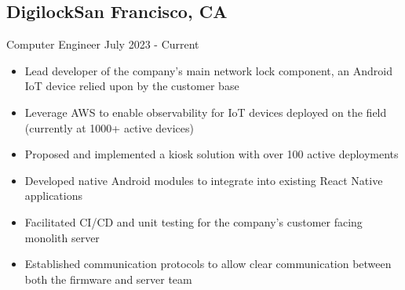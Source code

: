 \documentclass[a4,10pt]{article}
\newcommand{\subtext}[1]{
#1\par\vspace{-0.2cm}}
\newenvironment{zitemize}{
\begin{itemize}\itemsep0pt \parskip0pt \parsep1pt}
{\end{itemize}\vspace{-0.5cm}}
\begin{document}

\subsection*{Digilock\hfill San Francisco, CA} 
\subtext{Computer Engineer \hfill July 2023 - Current} 
    \begin{zitemize}
        \item Lead developer of the company’s main network lock component, an Android IoT device relied upon by the customer base
        \item Leverage AWS to enable observability for IoT devices deployed on the field (currently at 1000+ active devices)
        \item Proposed and implemented a kiosk solution with over 100 active deployments
        \item Developed native Android modules to integrate into existing React Native applications
        \item Facilitated CI/CD and unit testing for the company's customer facing monolith server
        \item Established communication protocols to allow clear communication between both the firmware and server team


        
    
    \end{zitemize}
\end{document}
